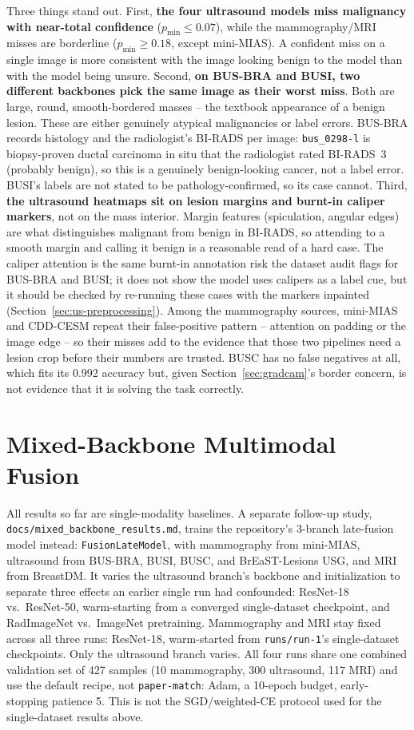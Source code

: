 \documentclass[11pt]{article}
\begin{document}
Three things stand out. First, \textbf{the four ultrasound models
miss malignancy with near-total confidence} ($p_{\min} \le 0.07$), while
the mammography/MRI misses are borderline ($p_{\min} \ge 0.18$, except
mini-MIAS). A confident miss on a single image is more consistent with
the image looking benign to the model than with the model being unsure.
Second, \textbf{on BUS-BRA and BUSI, two different backbones pick the
same image as their worst miss}. Both are large, round, smooth-bordered
masses -- the textbook appearance of a benign lesion. These are either
genuinely atypical malignancies or label errors. BUS-BRA records histology
and the radiologist's BI-RADS per image: \texttt{bus\_0298-l} is
biopsy-proven ductal carcinoma in situ that the radiologist rated
BI-RADS~3 (probably benign), so this is a genuinely benign-looking cancer,
not a label error. BUSI's labels are
not stated to be pathology-confirmed, so its case cannot. Third, \textbf{the ultrasound heatmaps sit on lesion margins
and burnt-in caliper markers}, not on the mass interior. Margin features
(spiculation, angular edges) are what distinguishes malignant from benign
in BI-RADS, so attending to a smooth margin and calling it benign is a
reasonable read of a hard case. The caliper attention is the same
burnt-in annotation risk the dataset audit flags for BUS-BRA and BUSI;
it does not show the model uses calipers as a label cue, but it should be
checked by re-running these cases with the markers inpainted
(Section~\ref{sec:us-preprocessing}). Among the mammography sources,
mini-MIAS and CDD-CESM repeat their false-positive pattern -- attention on
padding or the image edge -- so their misses add to the evidence that
those two pipelines need a lesion crop before their numbers are trusted.
BUSC has no false negatives at all, which fits its 0.992 accuracy but,
given Section~\ref{sec:gradcam}'s border concern, is not evidence that it
is solving the task correctly.

\section{Mixed-Backbone Multimodal Fusion}
\label{sec:mixed-fusion}

All results so far are single-modality baselines. A separate follow-up
study, \texttt{docs/mixed\_backbone\_results.md}, trains the repository's
3-branch late-fusion model instead: \texttt{FusionLateModel}, with
mammography from mini-MIAS, ultrasound from BUS-BRA, BUSI, BUSC, and
BrEaST-Lesions USG, and MRI from BreastDM. It varies the ultrasound
branch's backbone and initialization to separate three effects an earlier
single run had confounded: ResNet-18 vs.\ ResNet-50, warm-starting from a
converged single-dataset checkpoint, and RadImageNet vs.\ ImageNet
pretraining. Mammography and MRI stay fixed across all three runs:
ResNet-18, warm-started from \texttt{runs/run-1}'s single-dataset
checkpoints. Only the ultrasound branch varies. All four runs share one
combined validation set of 427 samples (10 mammography, 300 ultrasound, 117
MRI) and use the default recipe, not \texttt{paper-match}: Adam, a 10-epoch
budget, early-stopping patience 5. This is not the SGD/weighted-CE protocol
used for the single-dataset results above.
\end{document}

